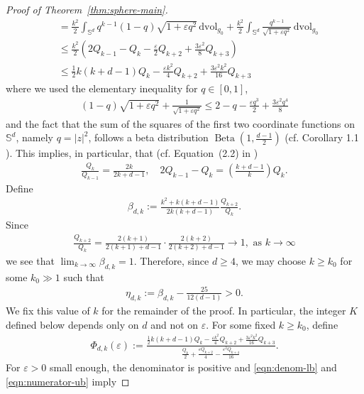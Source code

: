 \documentclass[11pt,reqno]{amsart}
\numberwithin{equation}{section}
\theoremstyle{definition}
\theoremstyle{remark}
\newcommand{\0}{\emptyset}
\newcommand{\veps}{\varepsilon}
\newcommand{\bbS}{\mathbb S}
\newcommand{\dvol}{\,\mathrm{dvol}}
\begin{document}
\begin{proof}[Proof of Theorem~\ref{thm:sphere-main}]
\begin{align}
&= \frac{k^2}{2}\int_{\bbS^d} q^{k-1}(1-q)\sqrt{1+\veps q^2} \dvol_{g_0}  + \frac{k^2}{2}\int_{\bbS^d}\frac{q^{k-1}}{\sqrt{1+\veps q^2}} \dvol_{g_0}\\
&\leq \frac{k^2}{2} \left(2Q_{k-1}-Q_k -\frac{\veps}{2}Q_{k+2}+\frac{3\veps^2}{8}Q_{k+3}\right)\\
&\leq \frac{1}{2}k(k+d-1)Q_k - \frac{\veps k^2}{4} Q_{k+2} + \frac{3\veps^2 k^2}{16} Q_{k+3}
\end{align}
where we used the elementary inequality for $q\in [0,1]$,
\begin{align}
    (1-q)\sqrt{1+\veps q^2} + \frac{1}{\sqrt{1+\veps q^2}}\leq 2-q-\frac{\veps q^3}{2} + \frac{3\veps^2q^4}{8}
\end{align}
and the fact that the sum of the squares of the first two coordinate functions on \(\bbS^d\),
namely \(q=|z|^2\), follows a beta distribution $\operatorname{Beta}(1,\frac{d-1}{2})$ (cf. Corollary 1.1 \cite{frankl1990some}). This implies, in particular, that (cf. Equation~(2.2) in \cite{szablowski2021moment})
\begin{align}
    \frac{Q_k}{Q_{k-1}} =\frac{2k}{2k+d-1},\quad 2Q_{k-1}-Q_k  =\left(\frac{k+d-1}{k}\right) Q_k.
\end{align}
Define
\begin{align}
        \beta_{d,k}
        :=
        \frac{k^2+k(k+d-1)}{2k(k+d-1)}
        \frac{Q_{k+2}}{Q_k}.
\end{align}
Since
\begin{align}
        \frac{Q_{k+2}}{Q_k}
        =
        \frac{2(k+1)}{2(k+1)+d-1}\cdot
        \frac{2(k+2)}{2(k+2)+d-1}
        \to 1, \text{ as }k\to \infty
\end{align}
we see that $\lim_{k\to\infty}\beta_{d,k}=1$. Therefore, since $d\geq4$, we may choose $k\geq k_0$ for some $k_0\gg 1$ such that
\begin{align}
        \eta_{d,k}:=\beta_{d,k}-\frac{25}{12(d-1)}>0.
\end{align}
We fix this value of $k$ for the remainder of the proof. In particular, the integer $K$ defined below depends only on $d$ and not on $\veps$. For some fixed \(k\geq k_0\), define
\begin{align}
        \Phi_{d,k}(\veps)
        :=
        \frac{
        \frac{1}{2}k(k+d-1)Q_k-\frac{\veps k^2}{4}Q_{k+2}
        +\frac{3\veps^2k^2}{16}Q_{k+3}}
        {\frac{Q_k}{2}+\frac{\veps Q_{k+2}}{4}-\frac{\veps^2Q_{k+4}}{16}}.
\end{align}
For $\veps>0$ small enough, the denominator is positive and
\eqref{eqn:denom-lb} and \eqref{eqn:numerator-ub} imply

\end{proof}
\end{document}
